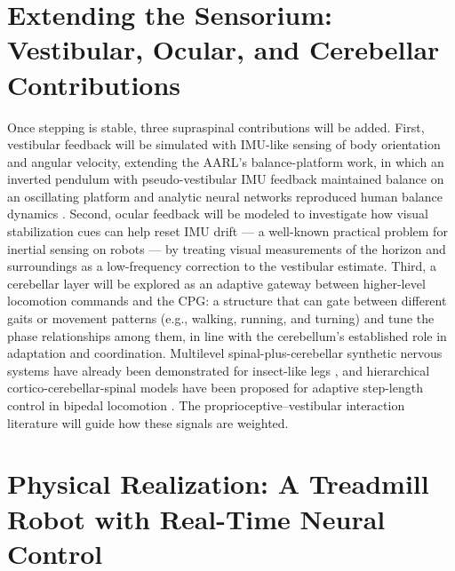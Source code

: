 \section{Extending the Sensorium: Vestibular, Ocular, and Cerebellar Contributions}\label{sec:fw_senses}

Once stepping is stable, three supraspinal contributions will be added. First, vestibular feedback will be simulated with IMU-like sensing of body orientation and angular velocity, extending the AARL's balance-platform work, in which an inverted pendulum with pseudo-vestibular IMU feedback maintained balance on an oscillating platform \citep{bolen_balance_2024, bolen_selfbalancing_2024, bolen_selfbalancing_srs_2024} and analytic neural networks reproduced human balance dynamics \citep{hilts_dynamic_2019}. Second, ocular feedback will be modeled to investigate how visual stabilization cues can help reset IMU drift --- a well-known practical problem for inertial sensing on robots --- by treating visual measurements of the horizon and surroundings as a low-frequency correction to the vestibular estimate. Third, a cerebellar layer will be explored as an adaptive gateway between higher-level locomotion commands and the CPG: a structure that can gate between different gaits or movement patterns (e.g., walking, running, and turning) and tune the phase relationships among them, in line with the cerebellum's established role in adaptation and coordination. Multilevel spinal-plus-cerebellar synthetic nervous systems have already been demonstrated for insect-like legs \citep{grummer_multilevel_2024}, and hierarchical cortico-cerebellar-spinal models have been proposed for adaptive step-length control in bipedal locomotion \citep{chen_corticocerebellar_2025}. The proprioceptive--vestibular interaction literature \citep{akay_relative_2021} will guide how these signals are weighted.

\section{Physical Realization: A Treadmill Robot with Real-Time Neural Control}\label{sec:fw_hardware}

